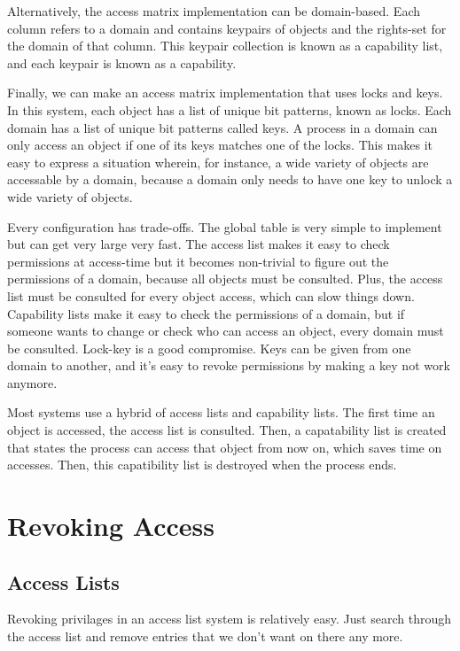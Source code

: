 \documentclass{article}
\begin{document}
Alternatively, the access matrix implementation can be domain-based. Each column
refers to a domain and contains keypairs of objects and the rights-set for the
domain of that column. This keypair collection is known as a capability list,
and each keypair is known as a capability.

Finally, we can make an access matrix implementation that uses locks and keys.
In this system, each object has a list of unique bit patterns, known as locks.
Each domain has a list of unique bit patterns called keys. A process in a domain
can only access an object if one of its keys matches one of the locks. This
makes it easy to express a situation wherein, for instance, a wide variety of
objects are accessable by a domain, because a domain only needs to have one key
to unlock a wide variety of objects.

Every configuration has trade-offs. The global table is very simple to implement
but can get very large very fast. The access list makes it easy to check
permissions at access-time but it becomes non-trivial to figure out the
permissions of a domain, because all objects must be consulted. Plus, the access
list must be consulted for every object access, which can slow things down.
Capability lists make it easy to check the permissions of a domain, but if
someone wants to change or check who can access an object, every domain must be
consulted. Lock-key is a good compromise. Keys can be given from one domain to
another, and it's easy to revoke permissions by making a key not work anymore.

Most systems use a hybrid of access lists and capability lists. The first time
an object is accessed, the access list is consulted. Then, a capatability list
is created that states the process can access that object from now on, which
saves time on accesses. Then, this capatibility list is destroyed when the
process ends.

\section{Revoking Access}

\subsection{Access Lists}

Revoking privilages in an access list system is relatively easy. Just search
through the access list and remove entries that we don't want on there any more.
\end{document}
